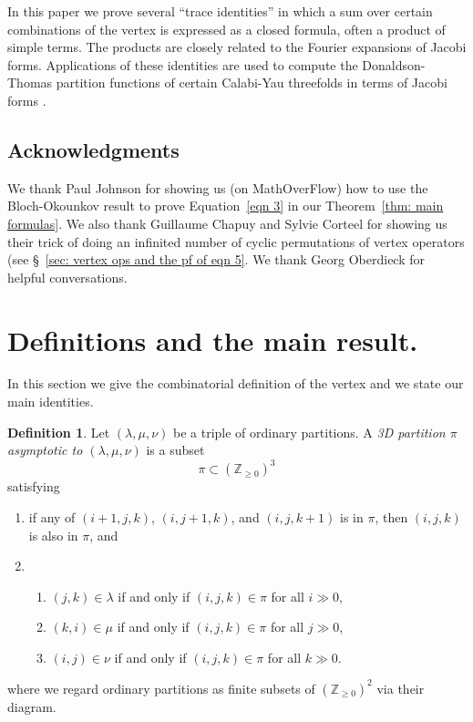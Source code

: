 \documentclass[12pt]{amsart}
\newcommand{\znums} {{\mathbb Z}}		%
\theoremstyle{definition}
\newtheorem{defn}[theorem]{Definition}
\begin{document}
In this paper we prove several ``trace identities'' in which a sum
over certain combinations of the vertex is expressed as a closed
formula, often a product of simple terms. The products are closely
related to the Fourier expansions of Jacobi forms. Applications of
these identities are used to compute the Donaldson-Thomas partition
functions of certain Calabi-Yau threefolds in terms of Jacobi forms
\cite{Bryan-K3xE,Bryan-Kool,BOPY}.

\subsection{Acknowledgments}\label{acknowledgments} We thank Paul
Johnson for showing us (on MathOverFlow) how to use the Bloch-Okounkov
result \cite{Bloch-Okounkov} to prove Equation~\eqref{eqn 3} in our
Theorem~\ref{thm: main formulas}. We also thank Guillaume Chapuy and
Sylvie Corteel for showing us their trick of doing an infinited number
of cyclic permutations of vertex operators (see \S~\ref{sec: vertex
ops and the pf of eqn 5}. We thank Georg Oberdieck for helpful
conversations.





\section{Definitions and the main result.}\label{sec: defns and
result}

In this section we give the combinatorial definition of the vertex and
we state our main identities.

\begin{defn}\label{defn: 3D partition asympt to (a,b,c)} Let $(\lambda
,\mu ,\nu )$ be a triple of ordinary partitions. A \emph{3D
partition $\pi $ asymptotic to $(\lambda ,\mu ,\nu )$} is a subset
\[
\pi \subset \left(\znums _{\geq 0} \right)^{3}
\]
satisfying
\begin{enumerate}
\item if any of $(i+1,j,k)$, $(i,j+1,k)$, and $(i,j,k+1)$ is in $\pi
$, then $(i,j,k)$ is also in $\pi $, and
\item
\begin{enumerate}
\item $(j,k)\in \lambda $ if and only if $(i,j,k)\in \pi $ for all $i\gg 0$,
\item $(k,i)\in \mu  $ if and only if $(i,j,k)\in \pi $ for all $j\gg 0$,
\item $(i,j)\in \nu  $ if and only if $(i,j,k)\in \pi $ for all $k\gg 0$.
\end{enumerate}
\end{enumerate}
where we regard ordinary partitions as finite subsets of $\left(\znums
_{\geq 0} \right)^{2}$ via their diagram.
\end{defn}
\end{document}
